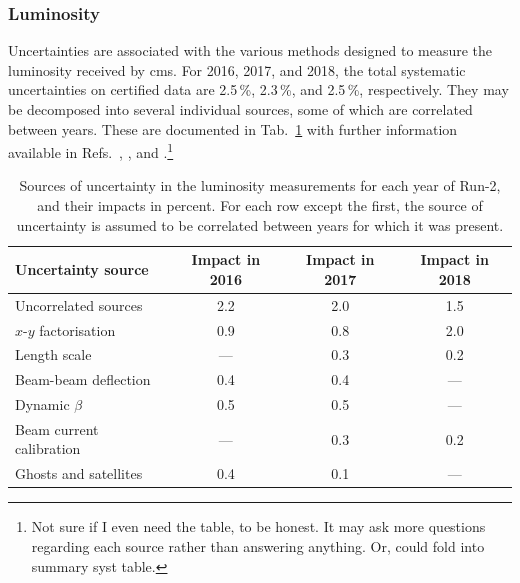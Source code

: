 \subsubsection{Luminosity}
\label{subsubsec:htoinv_lumi_syst}

Uncertainties are associated with the various methods designed to measure the luminosity received by \acrshort{cms}. For 2016, 2017, and 2018, the total systematic uncertainties on certified data are 2.5\,\%, 2.3\,\%, and 2.5\,\%, respectively. They may be decomposed into several individual sources, some of which are correlated between years. These are documented in Tab.~\ref{tab:lumi_systs} with further information available in Refs.~, , and .\footnote{Not sure if I even need the table, to be honest. It may ask more questions regarding each source rather than answering anything. Or, could fold into summary syst table.}

\begin{table}[htbp]
    \centering
    \begin{tabular}{lccc}
        \hline
        Uncertainty source & Impact in 2016 & Impact in 2017 & Impact in 2018 \\\hline
        Uncorrelated sources & 2.2 & 2.0 & 1.5 \\
        $x$-$y$ factorisation & 0.9 & 0.8 & 2.0 \\
        Length scale & --- & 0.3 & 0.2 \\
        Beam-beam deflection & 0.4 & 0.4 & --- \\
        Dynamic $\beta$ & 0.5 & 0.5 & --- \\
        Beam current calibration & --- & 0.3 & 0.2 \\
        Ghosts and satellites & 0.4 & 0.1 & ---  \\\hline
    \end{tabular}
    \caption[Sources of uncertainty in the luminosity measurements for each year of Run-2]{Sources of uncertainty in the luminosity measurements for each year of Run-2, and their impacts in percent. For each row except the first, the source of uncertainty is assumed to be correlated between years for which it was present.}
    \label{tab:lumi_systs}
\end{table}


